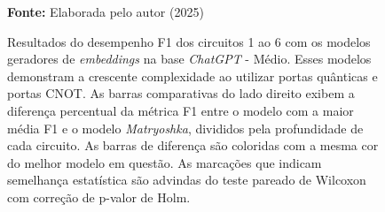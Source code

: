 \begin{figure}
\caption{Resultados do desempenho F1 dos circuitos 1 ao 6 com os modelos geradores de \textit{embeddings} na base \textit{ChatGPT} - Médio. Esses modelos demonstram a crescente complexidade ao utilizar portas quânticas e portas CNOT. As barras comparativas do lado direito exibem a diferença percentual da métrica F1 entre o modelo com a maior média F1 e o modelo \textit{Matryoshka}, divididos pela profundidade de cada circuito. As barras de diferença são coloridas com a mesma cor do melhor modelo em questão. As marcações que indicam semelhança estatística são advindas do teste pareado de Wilcoxon com correção de p-valor de Holm.}
\label{fig:model_transformer:medium:g1}
     \centering
    \centering

      \par\medskip\ABNTEXfontereduzida\selectfont\textbf{Fonte:} Elaborada pelo autor (2025) \par\medskip
\end{figure}